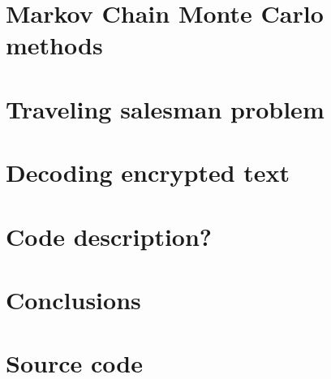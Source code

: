 \documentclass[a4paper, 12pt]{article}
\numberwithin{equation}{subsection}
\begin{document}
	\section{Markov Chain Monte Carlo methods}
	
	\section{Traveling salesman problem}
	
	\section{Decoding encrypted text}
	
	\section{Code description?}
	
	\section{Conclusions}
	
	\clearpage
	\nocite{*}
	
	
	
	
	
	\appendix
	\clearpage
	\section{Source code} \label{apsec:code}
	\clearpage
	
	
\end{document}
